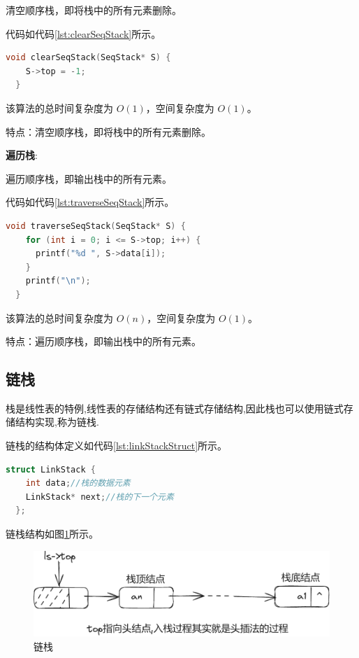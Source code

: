 \documentclass[lang=cn,newtx,10pt,scheme=chinese]{../elegantbook}
\begin{document}
清空顺序栈，即将栈中的所有元素删除。

代码如代码\ref{lst:clearSeqStack}所示。

\begin{lstlisting}[language=C++, caption={清空顺序栈示例代码}, label={lst:clearSeqStack}]
  void clearSeqStack(SeqStack* S) {
    S->top = -1;
  }

\end{lstlisting}

该算法的总时间复杂度为 $O(1)$，空间复杂度为 $O(1)$。

特点：清空顺序栈，即将栈中的所有元素删除。

\textbf{遍历栈}:

遍历顺序栈，即输出栈中的所有元素。

代码如代码\ref{lst:traverseSeqStack}所示。

\begin{lstlisting}[language=C++, caption={遍历顺序栈示例代码}, label={lst:traverseSeqStack}]
  void traverseSeqStack(SeqStack* S) {
    for (int i = 0; i <= S->top; i++) {
      printf("%d ", S->data[i]);
    }
    printf("\n");
  }

\end{lstlisting}

该算法的总时间复杂度为 $O(n)$，空间复杂度为 $O(1)$。

特点：遍历顺序栈，即输出栈中的所有元素。




\subsection{链栈}

栈是线性表的特例,线性表的存储结构还有链式存储结构,因此栈也可以使用链式存储结构实现,称为链栈.

链栈的结构体定义如代码\ref{lst:linkStackStruct}所示。

\begin{lstlisting}[language=C++, caption={链栈结构体定义}, label={lst:linkStackStruct}]
  struct LinkStack {
    int data;//栈的数据元素
    LinkStack* next;//栈的下一个元素
  };
\end{lstlisting}

链栈结构如图\ref{fig:linkStack}所示。

\begin{figure}[h]
  \centering
  \includegraphics[width=1\textwidth]{./figure/pdf/cropped/linkStack.pdf}
  \caption{链栈}
  \label{fig:linkStack}
\end{figure}
\end{document}
